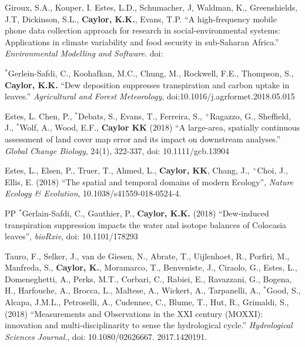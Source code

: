 \documentclass[10pt]{report}
\begin{document}
\begin{etaremune}
\item Giroux, S.A., Kouper, I. Estes, L.D., Schumacher, J, Waldman, K., Greenshields, J.T, Dickinson, S.L., \textbf{Caylor, K.K.}, Evans, T.P.  ``A high-frequency mobile phone data collection approach for research in social-environmental systems: Applications in climate variability and food security in sub-Saharan Africa.'' {\em Environmental Modelling and Software}. doi:


\item $^{*}$Gerlein-Safdi, C., Koohafkan, M.C., Chung, M., Rockwell, F.E., Thompson, S., \textbf{Caylor, K.K.} ``Dew deposition suppresses transpiration and carbon uptake in leaves.'' {\em Agricultural and Forest Meteorology}, doi:10.1016/j.agrformet.2018.05.015

\item Estes, L. Chen, P.,  $^{*}$Debats, S., Evans, T., Ferreira, S., $^{+}$Ragazzo, G., Sheffield, J., $^{*}$Wolf, A., Wood, E.F.,  \textbf{Caylor KK} (2018) ``A large-area, spatially continuous assessment of land cover map error and its impact on downstream analyses.'' {\em Global Change Biology}, 24(1), 322-337, doi: 10.1111/gcb.13904

\item Estes, L., Elsen, P., Truer, T., Ahmed, L., \textbf{Caylor, KK}, Chang, J., $^{+}$Choi, J., Ellis, E. (2018) ``The spatial and temporal domains of modern Ecology'', {\em Nature Ecology \& Evolution}, 10.1038/s41559-018-0524-4.

\item [PP] $^{*}$Gerlain-Safdi, C., Gauthier, P.,  \textbf{Caylor, K.K.} (2018) ``Dew-induced transpiration suppression impacts the water and isotope balances of Colocasia leaves'', {\em bioRxiv}, doi: 10.1101/178293

\item Tauro, F., Selker, J., van de Giesen, N., Abrate, T., Uijlenhoet, R., Porfiri, M., Manfreda, S., \textbf{Caylor, K.}, Moramarco, T., Benveniste, J., Ciraolo, G., Estes, L., Domeneghetti, A., Perks, M.T., Corbari, C., Rabiei, E., Ravazzani, G., Bogena, H., Harfouche, A., Brocca, L., Maltese, A., Wickert, A., Tarpanelli, A., $^{*}$Good, S., Alcapa, J.M.L., Petroselli, A., Cudennec, C., Blume, T., Hut, R., Grimaldi, S., (2018) ``Measurements and Observations in the XXI century (MOXXI): innovation and multi-disciplinarity to sense the hydrological cycle.'' {\em Hydrological Sciences Journal}., doi: 10.1080/02626667. 2017.1420191.



\end{etaremune}
\end{document}

